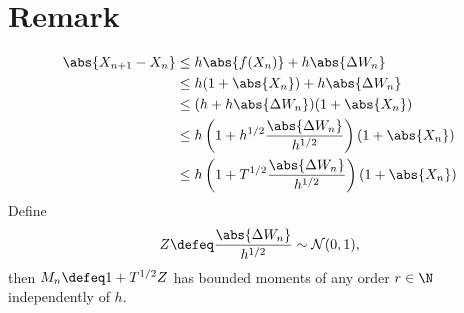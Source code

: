 \section{Remark}

\begin{equation}
\begin{aligned}
	\abs{X_{n+1} - X_n} &\leq h\abs{f(X_n)} + h\abs{\Delta W_n} \\
	&\leq h(1 + \abs{X_n}) + h\abs{\Delta W_n} \\
	&\leq (h + h\abs{\Delta W_n})(1 + \abs{X_n}) \\
	&\leq h\left(1 + h^{1/2}\frac{\abs{\Delta W_n}}{h^{1/2}}\right)(1 + \abs{X_n}) \\
	&\leq h\left(1 + T^{1/2}\frac{\abs{\Delta W_n}}{h^{1/2}}\right) (1 + \abs{X_n})
\end{aligned}
\end{equation}
Define 
\begin{equation}
	Z \defeq \frac{\abs{\Delta W_n}}{h^{1/2}} \sim \mathcal{N}(0, 1),
\end{equation} 
then $M_n \defeq 1 + T^{1/2}Z$ has bounded moments of any order $r \in \N$ independently of $h$.

